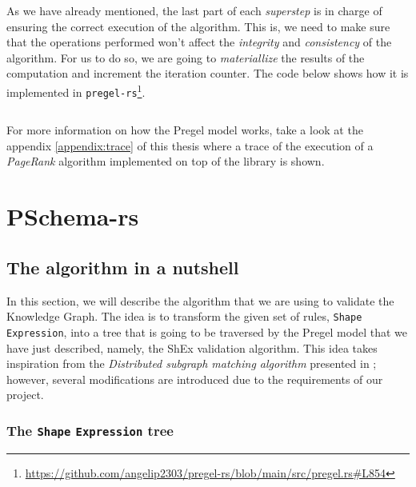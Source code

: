 \begin{code}
    \inputminted{rust}{code/listings/11-6_vprog.rs}
\end{code}

As we have already mentioned, the last part of each \textit{superstep} is in charge of ensuring the correct execution of the algorithm. This is, we need to make sure that the operations performed won't affect the \textit{integrity} and \textit{consistency} of the algorithm. For us to do so, we are going to \textit{materiallize} the results of the computation and increment the iteration counter. The code below shows how it is implemented in \texttt{pregel-rs}\footnote{\url{https://github.com/angelip2303/pregel-rs/blob/main/src/pregel.rs\#L854}}.

\begin{code}
    \inputminted{rust}{code/listings/11-7_collect.rs}
\end{code}

For more information on how the Pregel model works, take a look at the appendix \ref{appendix:trace} of this thesis where a trace of the execution of a \textit{PageRank} algorithm implemented on top of the library is shown.

\section{PSchema-rs}

\subsection{The algorithm in a nutshell}

In this section, we will describe the algorithm that we are using to validate the Knowledge Graph. The idea is to transform the given set of rules, \texttt{Shape} \texttt{Expression}, into a tree that is going to be traversed by the Pregel model that we have just described, namely, the ShEx validation algorithm. This idea takes inspiration from the \textit{Distributed subgraph matching algorithm} presented in \cite{Xu2019}; however, several modifications are introduced due to the requirements of our project.

\subsubsection{The \texttt{Shape} \texttt{Expression} tree}

